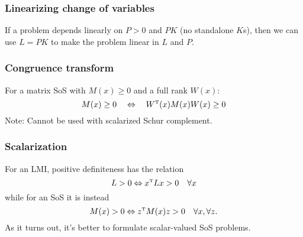 \subsubsection{Linearizing change of variables}
If a problem depends linearly on $P>0$ and $PK$ (no standalone $K$s), then we can use $L = PK$ to make the problem linear in $L$ and $P$.

\subsubsection{Congruence transform}
For a matrix SoS with $M(x) \geq 0$ and a full rank $W(x)$:
\begin{equation}
  M(x) \geq 0 \quad \Leftrightarrow \quad W\tp(x) M(x) W(x) \geq 0
\end{equation}
Note: Cannot be used with scalarized Schur complement.

\subsubsection{Scalarization}
For an LMI, positive definiteness has the relation
%
\begin{equation}
  L > 0 \Leftrightarrow x\tp L x > 0 \quad \forall x
\end{equation}
%
while for an SoS it is instead
%
\begin{equation}
  M(x) > 0 \Leftrightarrow z\tp M(x) z > 0 \quad \forall x, \forall z.
\end{equation}
%
As it turns out, it's better to formulate scalar-valued SoS problems.

